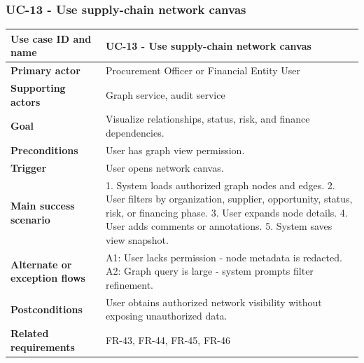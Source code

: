 \documentclass[11pt,a4paper]{article}
\begin{document}
\subsubsection{UC-13 - Use supply-chain network canvas}
\begin{footnotesize}
\begin{longtable}{@{}p{}p{}@{}}
\rowcolor{gray!10}\textbf{Use case ID and name} & UC-13 - Use supply-chain network canvas \\ \hline
\rowcolor{gray!10}\textbf{Primary actor} & Procurement Officer or Financial Entity User \\ \hline
\rowcolor{gray!10}\textbf{Supporting actors} & Graph service, audit service \\ \hline
\rowcolor{gray!10}\textbf{Goal} & Visualize relationships, status, risk, and finance dependencies. \\ \hline
\rowcolor{gray!10}\textbf{Preconditions} & User has graph view permission. \\ \hline
\rowcolor{gray!10}\textbf{Trigger} & User opens network canvas. \\ \hline
\rowcolor{gray!10}\textbf{Main success scenario} & 1. System loads authorized graph nodes and edges. 2. User filters by organization, supplier, opportunity, status, risk, or financing phase. 3. User expands node details. 4. User adds comments or annotations. 5. System saves view snapshot. \\ \hline
\rowcolor{gray!10}\textbf{Alternate or exception flows} & A1: User lacks permission - node metadata is redacted. A2: Graph query is large - system prompts filter refinement. \\ \hline
\rowcolor{gray!10}\textbf{Postconditions} & User obtains authorized network visibility without exposing unauthorized data. \\ \hline
\rowcolor{gray!10}\textbf{Related requirements} & FR-43, FR-44, FR-45, FR-46 \\ \hline
\end{longtable}
\end{footnotesize}
\end{document}
